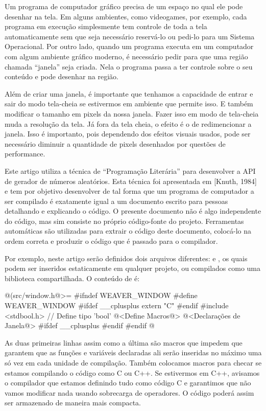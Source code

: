 
Um programa de computador gráfico precisa de um espaço no qual ele
pode desenhar na tela. Em alguns ambientes, como videogames, por
exemplo, cada programa em execução simplesmente tem controle de toda a
tela automaticamente sem que seja necessário reservá-lo ou pedi-lo
para um Sistema Operacional. Por outro lado, quando um programa
executa em um computador com algum ambiente gráfico moderno, é
necessário pedir para que uma região chamada ``janela'' seja
criada. Nela o programa passa a ter controle sobre o seu conteúdo e
pode desenhar na região.

Além de criar uma janela, é importante que tenhamos a capacidade de
entrar e sair do modo tela-cheia se estivermos em ambiente que permite
isso. E também modificar o tamanho em pixels da nossa janela. Fazer
isso em modo de tela-cheia muda a resolução da tela. Já fora da tela
cheia, o efeito é o de redimencionar a janela. Isso é importanto, pois
dependendo dos efeitos visuais usados, pode ser necessário diminuir a
quantidade de pixels desenhados por questões de performance.


Este artigo utiliza a técnica de ``Programação Literária'' para
desenvolver a API de gerador de números aleatórios. Esta técnica foi
apresentada em [Knuth, 1984] e tem por objetivo desenvolver
 de tal forma que um programa de computador a ser compilado
é exatamente igual a um documento escrito para pessoas detalhando e
explicando o código. O presente documento não é algo independente do
código, mas sim consiste no próprio código-fonte do projeto.
Ferramentas automáticas são utilizadas para extrair o código deste
documento, colocá-lo na ordem correta e produzir o código que é
passado para o compilador.

Por exemplo, neste artigo serão definidos dois arquivos
diferentes:  e , os quais
podem ser inseridos estaticamente em qualquer projeto, ou compilados
como uma biblioteca compartilhada. O conteúdo de 
é:

\iniciocodigo
@(src/window.h@>=
#ifndef WEAVER_WINDOW
#define WEAVER_WINDOW
#ifdef __cplusplus
extern "C" {
#endif
#include <stdbool.h> // Define tipo 'bool'
@<Define Macros@>
@<Declarações de Janela@>
#ifdef __cplusplus
}
#endif
#endif
@
\fimcodigo

As duas primeiras linhas assim como a última são macros que impedem
que garantem que as funções e variáveis declaradas ali serão inseridas
no máximo uma só vez em cada unidade de compilação. Também colocamos
macros para checar se estamos compilando o código como C ou C++. Se
estivermos em C++, avisamos o compilador que estamos definindo tudo
como código C e garantimos que não vamos modificar nada usando
sobrecarga de operadores. O código poderá assim ser armazenado de
maneira mais compacta.

